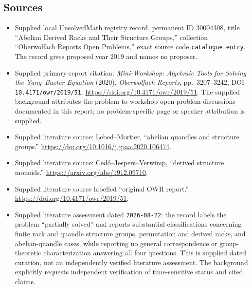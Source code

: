\documentclass[11pt]{article}
\begin{document}
\subsection{Sources}
\begin{itemize}
\item Supplied local UnsolvedMath registry record, permanent ID \(30004308\), title ``Abelian Derived Racks and Their Structure Groups,'' collection ``Oberwolfach Reports Open Problems,'' exact source code \texttt{catalogue entry}. The record gives proposed year 2019 and names no proposer.
\item Supplied primary-report citation: \emph{Mini-Workshop: Algebraic Tools for Solving the Yang--Baxter Equation} (2020), \emph{Oberwolfach Reports}, pp.~3207--3242, DOI \texttt{10.4171/owr/2019/51}. \url{https://doi.org/10.4171/owr/2019/51}. The supplied background attributes the problem to workshop open-problem discussions documented in this report; no problem-specific page or speaker attribution is supplied.
\item Supplied literature source: Lebed--Mortier, ``abelian quandles and structure groups.'' \url{https://doi.org/10.1016/j.jpaa.2020.106474}.
\item Supplied literature source: Ced\'o--Jespers--Verwimp, ``derived structure monoids.'' \url{https://arxiv.org/abs/1912.09710}.
\item Supplied literature source labelled ``original OWR report.'' \url{https://doi.org/10.4171/owr/2019/51}.
\item Supplied literature assessment dated \texttt{2026-08-22}: the record labels the problem ``partially solved'' and reports substantial classifications concerning finite rack and quandle structure groups, permutation and derived racks, and abelian-quandle cases, while reporting no general correspondence or group-theoretic characterization answering all four questions. This is supplied dated curation, not an independently verified literature assessment. The background explicitly requests independent verification of time-sensitive status and cited claims.
\end{itemize}
\end{document}
